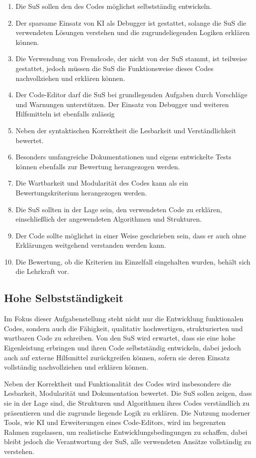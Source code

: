 \documentclass[a4paper,12pt]{article}
\begin{document}
\begin{enumerate}[label=\S\ \arabic*]
    \item Die SuS sollen den des Codes möglichst selbstständig entwickeln.
    \item Der sparsame Einsatz von KI als Debugger ist gestattet, solange die SuS die verwendeten Lösungen verstehen und die zugrundeliegenden Logiken erklären können.
    \item Die Verwendung von Fremdcode, der nicht von der SuS stammt, ist teilweise gestattet, jedoch müssen die SuS die Funktionsweise dieses Codes nachvollziehen und erklären können.
    \item Der Code-Editor darf die SuS bei grundlegenden Aufgaben durch Vorschläge und Warnungen unterstützen. Der Einsatz von Debugger und weiteren Hilfsmitteln ist ebenfalls zulässig
    \item Neben der syntaktischen Korrektheit die Lesbarkeit und Verständlichkeit bewertet.
    \item Besonders umfangreiche Dokumentationen und eigens entwickelte Tests können ebenfalls zur Bewertung herangezogen werden.
    \item Die Wartbarkeit und Modularität des Codes kann als ein Bewertungskriterium herangezogen werden.
    \item Die SuS sollten in der Lage sein, den verwendeten Code zu erklären, einschließlich der angewendeten Algorithmen und Strukturen.
    \item Der Code sollte möglichst in einer Weise geschrieben sein, dass er auch ohne Erklärungen weitgehend verstanden werden kann.
    \item Die Bewertung, ob die Kriterien im Einzelfall eingehalten wurden, behält sich die Lehrkraft vor.
\end{enumerate}


\subsection{Hohe Selbstständigkeit}
Im Fokus dieser Aufgabenstellung steht nicht nur die Entwicklung funktionalen Codes, sondern auch die Fähigkeit, qualitativ hochwertigen, strukturierten und wartbaren Code zu schreiben. Von den SuS wird erwartet, dass sie eine hohe Eigenleistung erbringen und ihren Code selbstständig entwickeln, dabei jedoch auch auf externe Hilfsmittel zurückgreifen können, sofern sie deren Einsatz vollständig nachvollziehen und erklären können.

Neben der Korrektheit und Funktionalität des Codes wird insbesondere die Lesbarkeit, Modularität und Dokumentation bewertet. Die SuS sollen zeigen, dass sie in der Lage sind, die Strukturen und Algorithmen ihres Codes verständlich zu präsentieren und die zugrunde liegende Logik zu erklären. Die Nutzung moderner Tools, wie KI und Erweiterungen eines Code-Editors, wird im begrenzten Rahmen zugelassen, um realistische Entwicklungsbedingungen zu schaffen, dabei bleibt jedoch die Verantwortung der SuS, alle verwendeten Ansätze vollständig zu verstehen.
\end{document}
